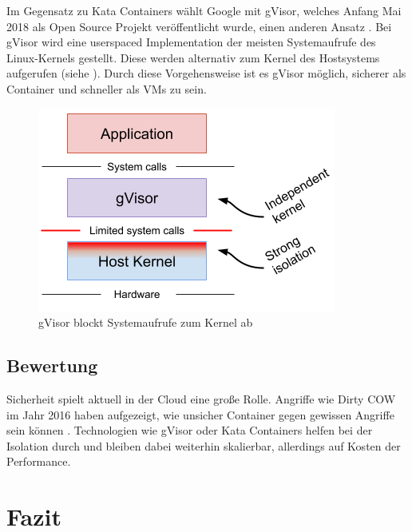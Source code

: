 Im Gegensatz zu Kata Containers wählt Google mit gVisor, welches Anfang Mai 2018 als Open Source Projekt veröffentlicht wurde, einen anderen Ansatz \citep{OpenSourcingGVisoraSandboxedContainerRuntime}. Bei gVisor wird eine userspaced Implementation der meisten Systemaufrufe des Linux-Kernels gestellt. Diese werden alternativ zum Kernel des Hostsystems aufgerufen (siehe ). Durch diese Vorgehensweise ist es gVisor möglich, sicherer als Container und schneller als VMs zu sein.

\begin{figure}[h]
	\begin{center}
		\includegraphics[scale=0.7]{bilder/gVisor.png}
		\caption{gVisor blockt Systemaufrufe zum Kernel ab \citep{OpenSourcingGVisoraSandboxedContainerRuntime}}
		\label{fig:gVisor}		
	\end{center}
\end{figure}

\pagebreak
\subsection{Bewertung}
\label{sec:compVMbasedBewertung}
Sicherheit spielt aktuell in der Cloud eine große Rolle. Angriffe wie Dirty COW im Jahr 2016 haben aufgezeigt, wie unsicher Container gegen gewissen Angriffe sein können \citep{DirtyCOWCVE20165195}. Technologien wie gVisor oder Kata Containers helfen bei der Isolation durch und bleiben dabei weiterhin skalierbar, allerdings auf Kosten der Performance.

\section{Fazit}
\label{sec:compFazit}

